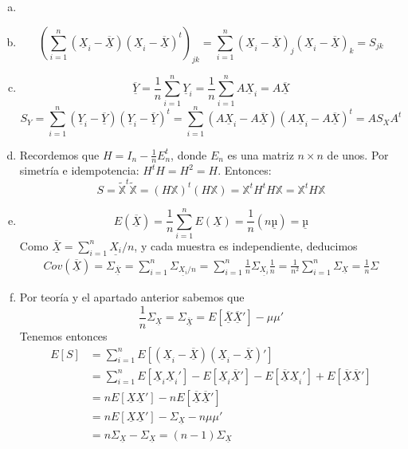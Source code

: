 \documentclass[twoside]{article}
\newcommand{\media}[1]{{\overline{#1}}}
\newcommand{\muestra}[1]{{\underline{#1}}}
\newcommand{\m}[1]{{\muestra{#1}}}
\newcommand{\mX}{{\muestra{X}}}
\begin{document}
\begin{solucion}
\begin{enumerate}[(a)]
\item[]
\item
\[ \left(\sum_{i=1}^n (\mX_i-\media{\m{X}})(\mX_i-\media{\m{X}})^t\right)_{jk} = \sum_{i=1}^n (\mX_i-\media{\m{X}})_j(\mX_i-\media{\m{X}})_k = S_{jk} \]
\item
\[ \media{\m{Y}} = \frac{1}{n} \sum_{i=1}^n \m{Y}_i = \frac{1}{n} \sum_{i=1}^n A\m{X}_i = A \media{\mX} \]
\[ S_Y = \sum_{i=1}^n (\m{Y}_i-\media{\m{Y}})(\m{Y}_i-\media{\m{Y}})^t = \sum_{i=1}^n (A\mX_i-A\media{\mX})(A\mX_i-A\media{\mX})^t = A S_X A^t\]
\item Recordemos que $H = I_n - \frac{1}{n}E_n^t$, donde $E_n$ es una matriz $n \times n$ de unos. 
Por simetría e idempotencia: $H^t H = H^2 = H$. Entonces:
\[ S = \tilde{\mathbb{X}}^t\tilde{\mathbb{X}} = (H \mathbb{X})^t (H \mathbb{X}) = \mathbb{X}^t H^t H \mathbb{X} = \mathbb{X}^t H \mathbb{X} \]
\item
\[ E(\media{\mX}) = \frac{1}{n}\sum_{i=1}^n E(\mX) = \frac{1}{n} (n \m{µ}) = \m{µ} \]
Como $\media{\mX}= \sum_{i=1}^n \muestra{X_i}/n$, y cada muestra es independiente, deducimos 
\begin{gather*}
 Cov(\media{\mX}) = \Sigma_{\media{\mX}}=\sum_{i=1}^n\Sigma_{\muestra{X_i}/n} = \sum_{i=1}^n\frac{1}{n} \Sigma_{\muestra{X_i}} \frac{1}{n} = \frac{1}{n^2}\sum_{i=1}^n \Sigma_{\muestra{X}}= \frac{1}{n}\Sigma
\end{gather*}
\item Por teoría y el apartado anterior sabemos que
$$
\frac{1}{n}\Sigma_\muestra{X}= \Sigma_{\media{\mX}}= E[\media{\mX}\media{\mX}']-\mu\mu'
$$
Tenemos entonces
\begin{align*}
E[S]&=\sum_{i=1}^nE[(\muestra{X}_i-\media{\mX})(\muestra{X}_i-\media{\mX})']\\
&= \sum_{i=1}^n E[\muestra{X}_i\muestra{X}_i'] - E[\muestra{X}_i\media{\mX}']- E[\media{\mX}\muestra{X}_i']+E[\media{\mX}\media{\mX}']\\
&=nE[\muestra{X}\muestra{X}'] -nE[\media{\mX}\media{\mX}']\\
&=nE[\muestra{X}\muestra{X}'] - \Sigma_\muestra{X} - n\mu\mu' \\&=
n\Sigma_\muestra{X}-\Sigma_\muestra{X} = (n-1)\Sigma_\muestra{X}
\end{align*}
\end{enumerate}

\end{solucion}
\end{document}
